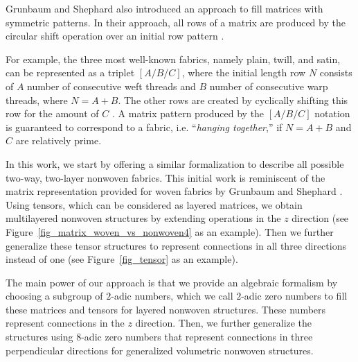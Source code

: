 \documentclass[times,twocolumn,final]{elsarticle}
\begin{document}
Grunbaum and Shephard also introduced an approach to fill matrices with symmetric patterns. In their approach, all rows of a matrix are produced by the circular shift operation \cite{arveson1984circular} over an initial row pattern \cite{grunbaum1980satins}. 

For example, the three most well-known fabrics, namely plain, twill, and satin, can be represented as a triplet $[A/B/C]$, where the initial length row $N$ consists of $A$ number of consecutive weft threads and $B$ number of consecutive warp threads, where $N=A+B$. The other rows are created by cyclically shifting this row for the amount of $C$ \cite{chen2010designing}. A matrix pattern produced by the $[A/B/C]$ notation is guaranteed to correspond to a fabric, i.e. ``\textit{hanging together},'' if $N=A+B$ and $C$ are relatively prime.

In this work, we start by offering a similar formalization to describe all possible two-way, two-layer nonwoven fabrics. This initial work is reminiscent of the matrix representation provided for woven fabrics by Grunbaum and Shephard \cite{grunbaum1980satins}. Using tensors, which can be considered as layered matrices, we obtain multilayered nonwoven structures by extending operations in the $z$ direction (see Figure~\ref{fig_matrix_woven_vs_nonwoven4} as an example). Then we further generalize these tensor structures to represent connections in all three directions instead of one (see Figure~\ref{fig_tensor} as an example). 

The main power of our approach is that we provide an algebraic formalism by choosing a subgroup of $2$-adic numbers, which we call $2$-adic zero numbers to fill these matrices and tensors for layered nonwoven structures. These numbers represent connections in the $z$ direction. Then, we further generalize the structures using $8$-adic zero numbers that represent connections in three perpendicular directions for generalized volumetric nonwoven structures. 
\end{document}

